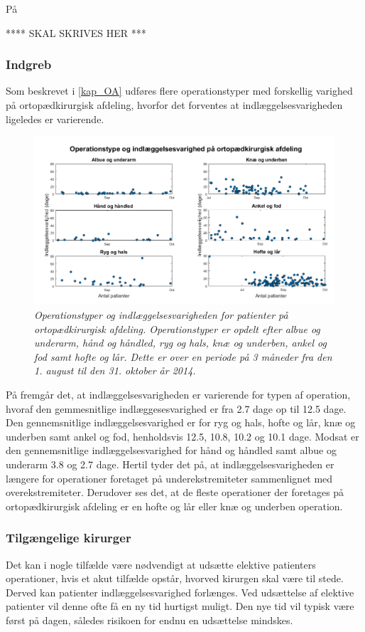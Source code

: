 \noindent
På 

**** SKAL SKRIVES HER ***


\subsubsection{Indgreb}
Som beskrevet i \ref{kap_OA} udføres flere operationstyper med forskellig varighed på ortopædkirurgisk afdeling, hvorfor det forventes at indlæggelsesvarigheden ligeledes er varierende. 


\begin{figure}[H]
	\centering
	\includegraphics[scale=0.5]{figures/operaogindlaeg}
	\caption{\textit{Operationstyper og indlæggelsesvarigheden for patienter på ortopædkirurgisk afdeling. Operationstyper er opdelt efter albue og underarm, hånd og håndled, ryg og hals, knæ og underben, ankel og fod samt hofte og lår. Dette er over en periode på 3 måneder fra den 1. august til den 31. oktober år 2014.}}
	\label{opvsindlaegtid}
\end{figure}


\noindent
På  fremgår det, at indlæggelsesvarigheden er varierende for typen af operation, hvoraf den gemmesnitlige indlæggesesvarighed er fra 2.7 dage op til 12.5 dage.  Den gennemsnitlige  indlæggelsesvarighed er for ryg og hals, hofte og lår, knæ og underben samt ankel og fod, henholdsvis 12.5, 10.8, 10.2 og 10.1 dage. Modsat er den gennemsnitlige indlæggelsesvarighed for hånd og håndled samt albue og underarm 3.8 og 2.7 dage. Hertil tyder det på, at indlæggelsesvarigheden er længere for operationer foretaget på underekstremiteter sammenlignet med overekstremiteter. Derudover ses det, at de fleste operationer der foretages på ortopædkirurgisk afdeling er en hofte og lår eller knæ og underben operation. 






\subsubsection{Tilgængelige kirurger}
Det kan i nogle tilfælde være nødvendigt at udsætte elektive patienters operationer, hvis et akut tilfælde opstår, hvorved kirurgen skal være til stede. Derved kan patienter indlæggelsesvarighed forlænges. Ved udsættelse af elektive patienter vil denne ofte få en ny tid hurtigst muligt. Den nye tid vil typisk være først på dagen, således risikoen for endnu en udsættelse mindskes.